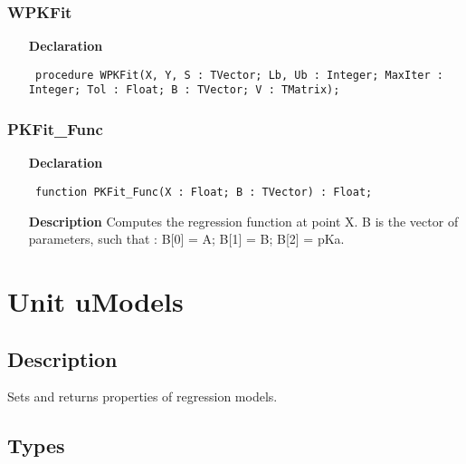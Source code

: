 \documentclass[12pt,a4paper,oneside]{report}
\newcommand{\declarationitem}[1]{\textbf{#1}}
\newcommand{\descriptiontitle}[1]{\textbf{#1}}
\newcommand{\code}[1]{\texttt{#1}}
\begin{document}
\subsubsection{WPKFit}
\label{upkfit-WPKFit}
\begin{itemize}\item[\declarationitem{Declaration}\hfill]
	\begin{flushleft}
		\code{
			procedure WPKFit(X, Y, S : TVector; Lb, Ub : Integer; MaxIter : Integer; Tol : Float; B : TVector; V : TMatrix);}
		
	\end{flushleft}
	
\end{itemize}
\subsubsection{PKFit{\_}Func}
\label{upkfit-PKFit_Func}
\begin{itemize}\item[\declarationitem{Declaration}\hfill]
	\begin{flushleft}
		\code{
			function PKFit{\_}Func(X : Float; B : TVector) : Float;}
		
	\end{flushleft}
	
	\par
	\item[\descriptiontitle{Description}]
	Computes the regression function at point X. B is the vector of parameters, such that : B[0] = A; B[1] = B; B[2] = pKa.
	
\end{itemize}

\section{Unit uModels}
\label{umodels}
\subsection{Description} Sets and returns properties of regression models.
\subsection{Types}
\end{document}

